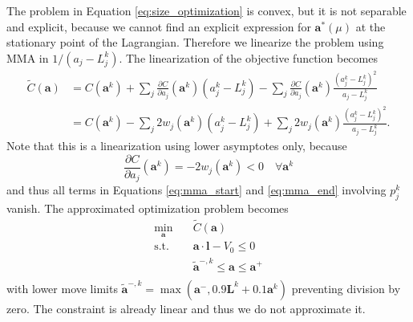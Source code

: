 The problem in Equation \eqref{eq:size_optimization} is convex, but it is not separable and explicit, because we cannot find an explicit expression for $\mathbf{a}^*(\mu)$ at the stationary point of the Lagrangian. Therefore we linearize the problem using MMA in $1/(a_j-L_j^k)$. The linearization of the objective function becomes
\begin{align}
    \tilde{C}(\mathbf{a}) &= C(\mathbf{a}^k) + \sum_j \frac{\partial C}{\partial a_j}(\mathbf{a}^k) (a^k_j-L^k_j) - \sum_j \frac{\partial C}{\partial a_j}(\mathbf{a}^k) \frac{(a^k_j-L^k_j)^2}{a_j-L^k_j}\\
    &=C(\mathbf{a}^k) 
    - \sum_j 2w_j (\mathbf{a}^k) (a^k_j-L^k_j)
    + \sum_j 2w_j (\mathbf{a}^k)
    \frac{(a^k_j-L^k_j)^2}{a_j-L^k_j}.
\end{align}
Note that this is a linearization using lower asymptotes only, because 
\begin{equation}
    \frac{\partial C }{\partial a_j}(\mathbf{a}^k)  = - 2 w_j (\mathbf{a}^k) < 0 \quad \forall \mathbf{a}^k
\end{equation} 
and thus all terms in Equations \eqref{eq:mma_start} and \eqref{eq:mma_end} involving $p_j^k$ vanish.
The approximated optimization problem becomes 
\begin{equation}
    \begin{aligned}
        \min_{\mathbf{a}} \quad & \tilde{C} (\mathbf{a})\\
        \textrm{s.t.} \quad & \mathbf{a} \cdot \mathbf{l} - V_0 \le 0  \\
                            & \tilde{\mathbf{a}}^{-,k} \le \mathbf{a} \le \mathbf{a}^+\\
    \end{aligned}
\end{equation}
with lower move limits $\tilde{\mathbf{a}}^{-,k} = \max(\mathbf{a}^-,  0.9 \mathbf{L}^k + 0.1 \mathbf{a}^k)$ preventing division by zero. The constraint is already linear and thus we do not approximate it.

